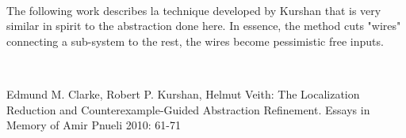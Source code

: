 \begin{enumerate}
~

The following work describes la technique developed by Kurshan that is very similar in spirit to the abstraction done here. In essence, the method cuts "wires" connecting a sub-system to the rest, the wires become pessimistic free inputs.

~

Edmund M. Clarke, Robert P. Kurshan, Helmut Veith:
The Localization Reduction and Counterexample-Guided Abstraction Refinement. Essays in Memory of Amir Pnueli 2010: 61-71



\end{enumerate}
